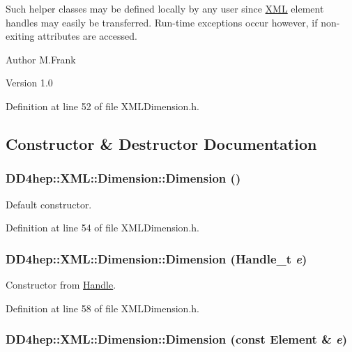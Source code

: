 Such helper classes may be defined locally by any user since \hyperlink{namespace_d_d4hep_1_1_x_m_l}{XML} element handles may easily be transferred. Run-\/time exceptions occur however, if non-\/exiting attributes are accessed.

\begin{DoxyAuthor}{Author}
M.Frank 
\end{DoxyAuthor}
\begin{DoxyVersion}{Version}
1.0 
\end{DoxyVersion}


Definition at line 52 of file XMLDimension.h.

\subsection{Constructor \& Destructor Documentation}
\hypertarget{struct_d_d4hep_1_1_x_m_l_1_1_dimension_a26a1bd5015aa6f00de8ab79682a42e89}{
\subsubsection[{Dimension}]{\setlength{\rightskip}{0pt plus 5cm}DD4hep::XML::Dimension::Dimension ()}}
\label{struct_d_d4hep_1_1_x_m_l_1_1_dimension_a26a1bd5015aa6f00de8ab79682a42e89}


Default constructor. 

Definition at line 54 of file XMLDimension.h.\hypertarget{struct_d_d4hep_1_1_x_m_l_1_1_dimension_a8b3cbebb82c2b3570c87147680386c99}{
\subsubsection[{Dimension}]{\setlength{\rightskip}{0pt plus 5cm}DD4hep::XML::Dimension::Dimension ({\bf Handle\_\-t} {\em e})}}
\label{struct_d_d4hep_1_1_x_m_l_1_1_dimension_a8b3cbebb82c2b3570c87147680386c99}


Constructor from \hyperlink{class_d_d4hep_1_1_handle}{Handle}. 

Definition at line 58 of file XMLDimension.h.\hypertarget{struct_d_d4hep_1_1_x_m_l_1_1_dimension_a692c1ee2c052d427794af750fe2faa6d}{
\subsubsection[{Dimension}]{\setlength{\rightskip}{0pt plus 5cm}DD4hep::XML::Dimension::Dimension (const {\bf Element} \& {\em e})}}
\label{struct_d_d4hep_1_1_x_m_l_1_1_dimension_a692c1ee2c052d427794af750fe2faa6d}


